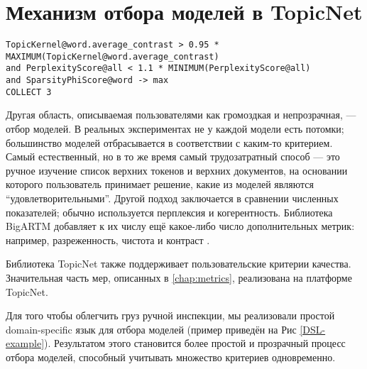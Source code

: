 \section{Механизм отбора моделей в TopicNet} 

\begin{figure*}[!ht]

\footnotesize

\texttt{TopicKernel@word.average\_contrast > 0.95 * MAXIMUM(TopicKernel@word.average\_contrast) \\

\hphantom{\ \ } and PerplexityScore@all < 1.1 * MINIMUM(PerplexityScore@all) \\

\hphantom{\ \ } and SparsityPhiScore@word -> max\\

\hphantom{\ \ } COLLECT 3}

\caption{This expression returns three models which are in the top 5\% according to contrast, has acceptable perplexity and as sparse as possible. \texttt{SparsityPhiScore} stands for the fraction of zeros in $\phi_{wt} = p(w \mid t)$ distribution.}

\label{DSL-example}

\end{figure*} 

Другая область, описываемая пользователями как громоздкая и непрозрачная, --- отбор моделей. В реальных экспериментах не у каждой модели есть потомки; большинство моделей отбрасывается в соответствии с каким-то критерием. Самый естественный, но в то же время самый трудозатратный способ --- это ручное изучение список верхних токенов и верхних документов, на основании которого пользователь принимает решение, какие из моделей являются ``удовлетворительными''. Другой подход заключается в сравнении численных показателей; обычно используется перплексия и когерентность. Библиотека \mbox{BigARTM} добавляет к их числу ещё какое-либо число дополнительных метрик: например, разреженность, чистота и контраст \cite{voron15mlj}.  

Библиотека TopicNet также поддерживает пользовательские критерии качества. Значительная часть мер, описанных в \ref{chap:metrics}, реализована на платформе TopicNet.  

Для того чтобы облегчить груз ручной инспекции, мы реализовали простой domain-specific язык для отбора моделей (пример приведён на Рис \ref{DSL-example}). Результатом этого становится более простой и прозрачный процесс отбора моделей, способный учитывать множество критериев одновременно.  


